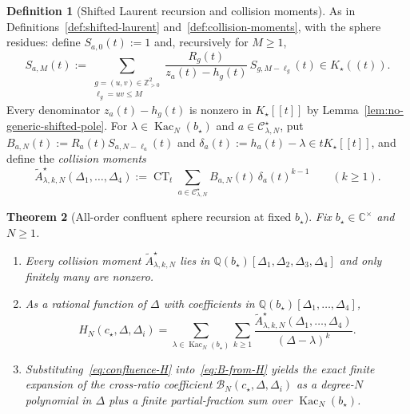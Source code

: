 \documentclass[twoside,10pt]{article}
\numberwithin{equation}{section}
\theoremstyle{slbody}
\newtheorem{theorem}{Theorem}[section]
\theoremstyle{definition}
\newtheorem{definition}[theorem]{Definition}
\theoremstyle{remark}
\newcommand{\CT}{\operatorname{CT}}
\begin{document}
\begin{definition}[Shifted Laurent recursion and collision moments]
\label{def:confluence}
As in Definitions~\ref{def:shifted-laurent} and~\ref{def:collision-moments},
with the sphere residues: define \(S_{a,0}(t):=1\) and, recursively for \(M\geq1\),
\begin{equation}\label{eq:shifted-rec}
 S_{a,M}(t)
 :=\sum_{\substack{g=(u,v)\in\mathbb Z_{>0}^2\\\ell_g=uv\leq M}}
  \frac{R_g(t)}{z_a(t)-h_g(t)}\,S_{g,M-\ell_g}(t)\in K_\star((t)).
\end{equation}
Every denominator \(z_a(t)-h_g(t)\) is nonzero in \(K_\star[[t]]\) by
Lemma~\ref{lem:no-generic-shifted-pole}.  For \(\lambda\in\operatorname{Kac}_N(b_\star)\) and
\(a\in\mathcal C^\star_{\lambda,N}\), put \(B_{a,N}(t):=R_a(t)S_{a,N-\ell_a}(t)\)
and \(\delta_a(t):=h_a(t)-\lambda\in tK_\star[[t]]\), and define the
\emph{collision moments}
\begin{equation}\label{eq:collision-moments-sph}
 \widetilde A^\star_{\lambda,k,N}(\Delta_1,\dots,\Delta_4)
 :=\CT_t\sum_{a\in\mathcal C^\star_{\lambda,N}}B_{a,N}(t)\,\delta_a(t)^{k-1}
 \qquad(k\geq1).
\end{equation}
\end{definition}

\begin{theorem}[All-order confluent sphere recursion at fixed \(b_\star\)]
\label{thm:confluence}
Fix \(b_\star\in\mathbb C^\times\) and \(N\geq1\).
\begin{enumerate}\setlength{\itemsep}{1pt}\setlength{\topsep}{3pt}
\item[(i)] Every collision moment \(\widetilde A^\star_{\lambda,k,N}\) lies
  in \(\mathbb Q(b_\star)[\Delta_1,\Delta_2,\Delta_3,\Delta_4]\) and only
  finitely many are nonzero.
\item[(ii)] As a rational function of \(\Delta\) with coefficients in
  \(\mathbb Q(b_\star)[\Delta_1,\dots,\Delta_4]\),
  \begin{equation}\label{eq:confluence-H}
   H_N(c_\star,\Delta,\Delta_i)
   =\sum_{\lambda\in\operatorname{Kac}_N(b_\star)}
    \sum_{k\geq1}
    \frac{\widetilde A^\star_{\lambda,k,N}(\Delta_1,\dots,\Delta_4)}{(\Delta-\lambda)^k}.
  \end{equation}
\item[(iii)] Substituting~\eqref{eq:confluence-H} into~\eqref{eq:B-from-H}
  yields the exact finite expansion of the cross-ratio coefficient
  \(\mathcal B_N(c_\star,\Delta,\Delta_i)\) as a degree-\(N\) polynomial in
  \(\Delta\) plus a finite partial-fraction sum over \(\operatorname{Kac}_N(b_\star)\).
\end{enumerate}
\end{theorem}
\end{document}
